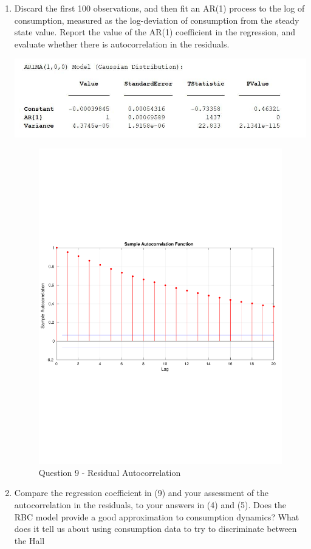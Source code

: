 \documentclass[11pt]{article}
\begin{document}
\begin{enumerate}
\newpage
\item Discard the first 100 observations, and then fit an AR(1) process to the
log of consumption, measured as the log-deviation of consumption from the
steady state value. Report the value of the AR(1) coefficient in the regression,
and evaluate whether there is autocorrelation in the residuals.



\begin{center}
\includegraphics[scale=0.75]{MacroHW2_Q9.JPG}
\end{center}

\begin{figure}[htp]
\centering
\includegraphics[scale=0.75]{Q9_ResidualAutocorrelationPlot.pdf}
\caption{Question 9 - Residual Autocorrelation}
\end{figure}

\newpage
\item Compare the regression coefficient in (9) and your assessment of the
autocorrelation in the residuals, to your answers in (4) and (5). Does the RBC
model provide a good approximation to consumption dynamics? What does it
tell us about using consumption data to try to discriminate between the Hall
\end{enumerate}
\end{document}
